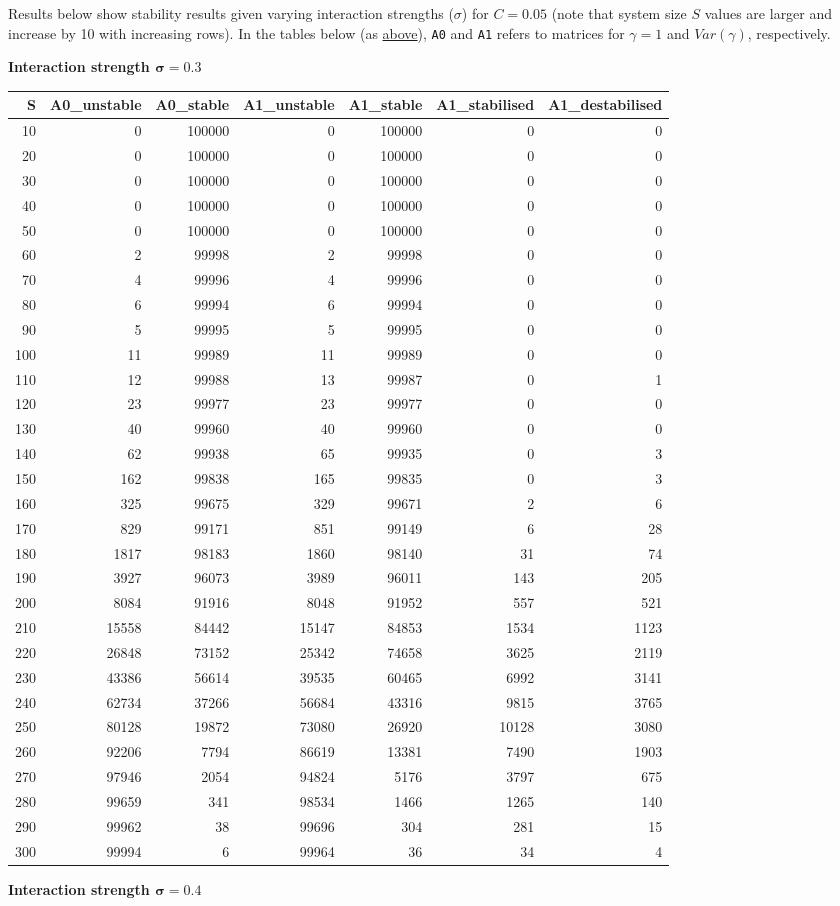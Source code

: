 \documentclass[]{article}
\begin{document}
Results below show stability results given varying interaction strengths
(\(\sigma\)) for \(C = 0.05\) (note that system size \(S\) values are
larger and increase by 10 with increasing rows). In the tables below (as
\protect\hyperlink{IncrS}{above}), \texttt{A0} and \texttt{A1} refers to
matrices for \(\gamma = 1\) and \(Var(\gamma)\), respectively.

\textbf{Interaction strength \(\mathbf{\sigma = 0.3}\)}

\begin{longtable}[]{@{}rrrrrrr@{}}
\toprule
S & A0\_unstable & A0\_stable & A1\_unstable & A1\_stable &
A1\_stabilised & A1\_destabilised\tabularnewline
\midrule
\endhead
10 & 0 & 100000 & 0 & 100000 & 0 & 0\tabularnewline
20 & 0 & 100000 & 0 & 100000 & 0 & 0\tabularnewline
30 & 0 & 100000 & 0 & 100000 & 0 & 0\tabularnewline
40 & 0 & 100000 & 0 & 100000 & 0 & 0\tabularnewline
50 & 0 & 100000 & 0 & 100000 & 0 & 0\tabularnewline
60 & 2 & 99998 & 2 & 99998 & 0 & 0\tabularnewline
70 & 4 & 99996 & 4 & 99996 & 0 & 0\tabularnewline
80 & 6 & 99994 & 6 & 99994 & 0 & 0\tabularnewline
90 & 5 & 99995 & 5 & 99995 & 0 & 0\tabularnewline
100 & 11 & 99989 & 11 & 99989 & 0 & 0\tabularnewline
110 & 12 & 99988 & 13 & 99987 & 0 & 1\tabularnewline
120 & 23 & 99977 & 23 & 99977 & 0 & 0\tabularnewline
130 & 40 & 99960 & 40 & 99960 & 0 & 0\tabularnewline
140 & 62 & 99938 & 65 & 99935 & 0 & 3\tabularnewline
150 & 162 & 99838 & 165 & 99835 & 0 & 3\tabularnewline
160 & 325 & 99675 & 329 & 99671 & 2 & 6\tabularnewline
170 & 829 & 99171 & 851 & 99149 & 6 & 28\tabularnewline
180 & 1817 & 98183 & 1860 & 98140 & 31 & 74\tabularnewline
190 & 3927 & 96073 & 3989 & 96011 & 143 & 205\tabularnewline
200 & 8084 & 91916 & 8048 & 91952 & 557 & 521\tabularnewline
210 & 15558 & 84442 & 15147 & 84853 & 1534 & 1123\tabularnewline
220 & 26848 & 73152 & 25342 & 74658 & 3625 & 2119\tabularnewline
230 & 43386 & 56614 & 39535 & 60465 & 6992 & 3141\tabularnewline
240 & 62734 & 37266 & 56684 & 43316 & 9815 & 3765\tabularnewline
250 & 80128 & 19872 & 73080 & 26920 & 10128 & 3080\tabularnewline
260 & 92206 & 7794 & 86619 & 13381 & 7490 & 1903\tabularnewline
270 & 97946 & 2054 & 94824 & 5176 & 3797 & 675\tabularnewline
280 & 99659 & 341 & 98534 & 1466 & 1265 & 140\tabularnewline
290 & 99962 & 38 & 99696 & 304 & 281 & 15\tabularnewline
300 & 99994 & 6 & 99964 & 36 & 34 & 4\tabularnewline
\bottomrule
\end{longtable}

\textbf{Interaction strength \(\mathbf{\sigma = 0.4}\)}
\end{document}
